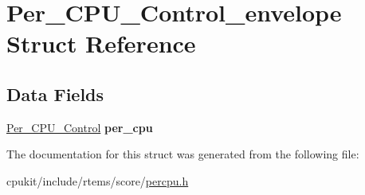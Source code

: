 \hypertarget{structPer__CPU__Control__envelope}{}\section{Per\+\_\+\+C\+P\+U\+\_\+\+Control\+\_\+envelope Struct Reference}
\label{structPer__CPU__Control__envelope}
\subsection*{Data Fields}
\begin{DoxyCompactItemize}
\item 
\mbox{\label{structPer__CPU__Control__envelope_a16ed17b027e0493c6e110cc632713351}} 
\mbox{\hyperlink{structPer__CPU__Control}{Per\+\_\+\+C\+P\+U\+\_\+\+Control}} {\bfseries per\+\_\+cpu}
\end{DoxyCompactItemize}


The documentation for this struct was generated from the following file\+:\begin{DoxyCompactItemize}
\item 
cpukit/include/rtems/score/\mbox{\hyperlink{score_2percpu_8h}{percpu.\+h}}\end{DoxyCompactItemize}
